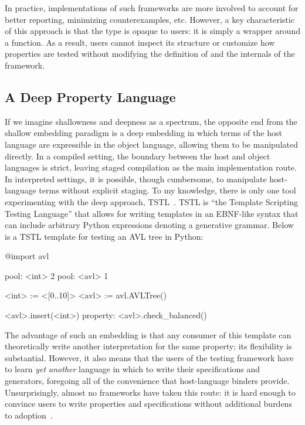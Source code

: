 In practice, implementations of such frameworks are more involved to account for better
reporting, minimizing counterexamples, etc. However, a key characteristic of this
approach is that the  type is opaque to users: it is simply a wrapper
around a function. As a result, users cannot inspect its structure or customize how
properties are tested without modifying the definition of  and the
internals of the framework.

\subsection{A Deep Property Language}

If we imagine shallowness and deepness as a spectrum, the opposite end from the shallow
embedding paradigm is a deep embedding in which terms of the host language are
expressible in the object language, allowing them to be manipulated directly. In a
compiled setting, the boundary between the host and object languages is strict, leaving
staged compilation as the main implementation route. In interpreted settings, it is
possible, though cumbersome, to manipulate host-language terms without explicit
staging. To my knowledge, there is only one tool experimenting with the deep approach,
TSTL~\cite{holmes2018tstl}. TSTL is ``the Template Scripting Testing Language'' that
allows for writing templates in an EBNF-like syntax that can include arbitrary Python
expressions denoting a generative grammar. Below is a TSTL template for testing an AVL
tree in Python:

\begin{code}[language=TSTL]
@import avl

pool: <int> 2
pool: <avl> 1

<int> := <[0..10]>
<avl> := avl.AVLTree()

<avl>.insert(<int>)
property: <avl>.check_balanced()
\end{code}

The advantage of such an embedding is that any consumer of this template can
theoretically write another interpretation for the same property; its flexibility is
substantial. However, it also means that the users of the testing framework have to
learn \emph{yet another} language in which to write their specifications and
generators, foregoing all of the convenience that host-language binders provide.
Unsurprisingly, almost no frameworks have taken this route: it is hard enough to
convince users to write properties and specifications without additional burdens to
adoption~\cite{goldsteinPropertyBasedTestingPractice2024}.

